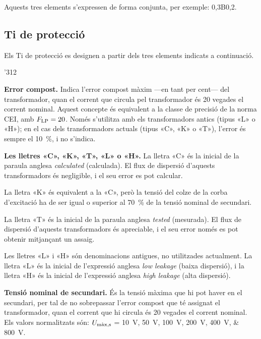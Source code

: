 Aquests tres elements s'expressen de forma conjunta, per exemple:
0,3B0,2.

\subsection{Ti de protecció}\label{sec:Ti-prot-IEEE}

Els Ti de protecció es designen a
partir dels tres elements indicats a continuació.

\begin{dingautolist}{'312}
    \item \textbf{Error compost.} Indica l'error compost màxim ---en tant per cent--- del
    transformador, quan el corrent que circula pel
    transformador és 20 vegades el corrent nominal. Aquest concepte
     és equivalent a la classe de precisió de la norma CEI,
     amb $F_\mathrm{LP}=20$. Només s'utilitza amb els transformadors antics (tipus «L» o «H»); en el cas dels transformadors actuals
     (tipus «C», «K» o «T»), l'error és sempre el \qty{10}{\percent}, i no s'indica.

    \item \textbf{Les lletres «C», «K», «T», «L» o «H».} La lletra «C» és la inicial de la
    paraula  anglesa \textit{calculated} (calculada). El flux de dispersió d'aquests transformadors és negligible, i el seu error es pot calcular.

    La lletra «K» és equivalent a la «C», però la tensió del colze de la corba d'excitació ha de ser igual o superior al \qty{70}{\percent}
    de la tensió nominal de secundari.

    La lletra «T» és la inicial de la   paraula  anglesa \textit{tested} (mesurada). El flux de dispersió d'aquests transformadors és apreciable, i el seu error només es pot obtenir mitjançant un assaig.

    Les lletres «L» i «H» són denominacions antigues,  no utilitzades actualment. La lletra «L» és la inicial de l'expressió anglesa \textit{low leakage} (baixa
    dispersió), i la lletra «H» és la inicial de l'expressió anglesa \textit{high leakage} (alta dispersió).  
 
    \item \textbf{Tensió nominal de secundari.} És la tensió màxima
    que hi pot haver en el secundari, per tal de no sobrepassar l'error compost que té
    assignat el transformador, quan el corrent que hi circula
     és 20 vegades el corrent nominal. Els valors
    normalitzats són: $U_\mathrm{m\grave{a}x,s}$ = \qtylist{10; 50; 100; 200; 400; 800}{V}.


\end{dingautolist}
